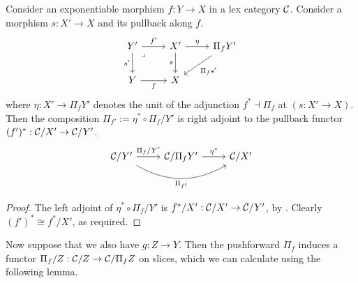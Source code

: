 \begin{lemma} \label{lem:pushforward-along-pullback}
  Consider an exponentiable morphism $f : Y \to X$
  in a lex category $\mathcal{C}$.
  Consider a morphism $s : X' \to X$ and its pullback along $f$.
  \[\begin{tikzcd}
    {Y'} & {X'} & {\Pi_f Y'} \\
    Y & X
    \arrow["{{{f'}}}", from=1-1, to=1-2]
    \arrow["{{{s'}}}"', from=1-1, to=2-1]
    \arrow["\lrcorner"{anchor=center, pos=0.125}, draw=none, from=1-1, to=2-2]
    \arrow["{{{\eta}}}", from=1-2, to=1-3]
    \arrow["s"', from=1-2, to=2-2]
    \arrow["{{{\Pi_f s'}}}", from=1-3, to=2-2]
    \arrow["f"', from=2-1, to=2-2]
  \end{tikzcd}\]
  where $\eta : X' \to \Pi_f Y'$ denotes the unit of the adjunction
  $f^* \dashv \Pi_f$ at $(s : X' \to X)$.
  Then the composition $\Pi_{f'} := \eta^* \circ \Pi_f / Y'$
  is right adjoint to the pullback functor
  $(f')^* : \mathcal{C} / X' \to \mathcal{C} / Y'$.
  \[ \begin{tikzcd}
    {\CC / Y'} & {\CC / \Pi_f Y'} & {\CC / X'}
    \arrow["{\Pi_f / Y'}", from=1-1, to=1-2]
    \arrow["{\Pi_{f'}}"', bend right, from=1-1, to=1-3]
    \arrow["{\eta^*}", from=1-2, to=1-3]
  \end{tikzcd} \]
\end{lemma}
\begin{proof}
  The left adjoint of $\eta^* \circ \Pi_f / Y'$
  is $f^* / X' : \mathcal{C} / X' \to \mathcal{C} / Y'$,
  by .
  Clearly $(f')^* \cong f^* / X'$, as required. 
\end{proof}

Now suppose that we also have $g : Z \to Y$.
Then the pushforward $\Pi_f$ induces a functor
$\Pi_f / Z : \mathcal{C} / Z \to \mathcal{C} / \Pi_f Z$ on slices,
which we can calculate using the following lemma.

